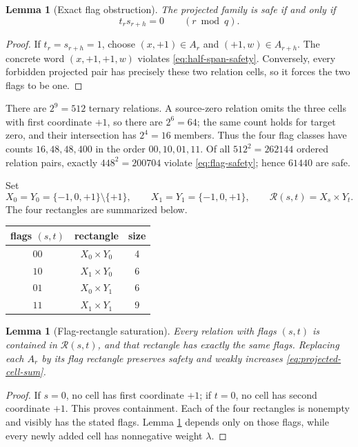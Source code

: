\documentclass[11pt]{article}
\newtheorem{lemma}[theorem]{Lemma}
\theoremstyle{definition}
\theoremstyle{remark}
\newcommand{\T}{\{-1,0,+1\}}
\newcommand{\rect}{\mathcal R}
\begin{document}
\begin{lemma}[Exact flag obstruction]
\label{lem:flag-obstruction}
The projected family is safe if and only if
\begin{equation}
 t_rs_{r+h}=0\qquad(r\bmod q).
 \label{eq:flag-safety}
\end{equation}
\end{lemma}

\begin{proof}
If \(t_r=s_{r+h}=1\), choose \((x,+1)\in A_r\) and
\((+1,w)\in A_{r+h}\).  The concrete word \((x,+1,+1,w)\) violates
\eqref{eq:half-span-safety}.  Conversely, every forbidden projected pair
has precisely these two relation cells, so it forces the two flags to be one.
\end{proof}

There are \(2^9=512\) ternary relations.  A source-zero relation omits the
three cells with first coordinate \(+1\), so there are \(2^6=64\); the same
count holds for target zero, and their intersection has \(2^4=16\) members.
Thus the four flag classes have counts \(16,48,48,400\) in the order
\(00,10,01,11\).  Of all \(512^2=262144\) ordered relation pairs, exactly
\(448^2=200704\) violate \eqref{eq:flag-safety}; hence \(61440\) are safe.

Set
\[
 X_0=Y_0=\T\setminus\{+1\},\qquad X_1=Y_1=\T,
 \qquad \rect(s,t)=X_s\times Y_t.
\]
The four rectangles are summarized below.
\begin{center}
\begin{tabular}{c@{\qquad}c@{\qquad}c}
\toprule
flags \((s,t)\)&rectangle&size\\
\midrule
\(00\)&\(X_0\times Y_0\)&4\\
\(10\)&\(X_1\times Y_0\)&6\\
\(01\)&\(X_0\times Y_1\)&6\\
\(11\)&\(X_1\times Y_1\)&9\\
\bottomrule
\end{tabular}
\label{tab:flag-rectangles}
\end{center}

\begin{lemma}[Flag-rectangle saturation]
\label{lem:flag-rectangle-saturation}
Every relation with flags \((s,t)\) is contained in \(\rect(s,t)\), and
that rectangle has exactly the same flags.  Replacing each \(A_r\) by its
flag rectangle preserves safety and weakly increases
\eqref{eq:projected-cell-sum}.
\end{lemma}

\begin{proof}
If \(s=0\), no cell has first coordinate \(+1\); if \(t=0\), no cell has
second coordinate \(+1\).  This proves containment.  Each of the four
rectangles is nonempty and visibly has the stated flags.  Lemma
\ref{lem:flag-obstruction} depends only on those flags, while every newly
added cell has nonnegative weight \(\lambda\).
\end{proof}
\end{document}
